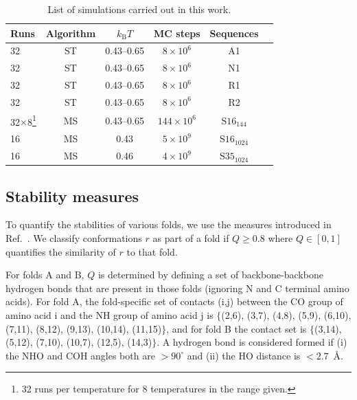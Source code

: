 \documentclass[%
 aip,
rsi,%
 amsmath,amssymb,
 reprint,%
]{revtex4-1}
\newcommand	 {\kb}		{{k_\mathrm{B}}}
\begin{document}
\begin{table}
\caption{\label{tab2} List of simulations carried out in this work. }
\begin{ruledtabular}
\begin{tabular}{lccccr}
Runs & Algorithm & $\kb T$  & MC steps &  Sequences\\
\hline
32 & ST & 0.43--0.65 & $8\times 10^6$ &A1\\ 
32 & ST & 0.43--0.65 & $8\times 10^6$ &N1\\ 
32 & ST & 0.43--0.65 & $8\times 10^6$ &R1\\ 
32 & ST & 0.43--0.65 & $8\times 10^6$ &R2\\ 
32$\times$8\footnote{32  runs per temperature for 8 temperatures in the range given.} & MS &0.43--0.65& $144\times 10^6$ & $\mathrm{S16}_{144}$\\
16 & MS & 0.43  & $5\times 10^9$ &  $\mathrm{S16}_{1024}$ \\
16 & MS & 0.46 & $4\times 10^9$ &  $\mathrm{S35}_{1024}$ \\
\end{tabular}
\end{ruledtabular}
\end{table}

\subsection{Stability measures}
\noindent
To quantify the stabilities of various folds, we use the measures introduced in Ref.~\cite{Holzgrafe2015}. We classify conformations $r$ as part of a fold if $Q\ge0.8$ where $Q\in [0,1]$ quantifies the similarity of $r$ to that fold. 

For folds A and B, $Q$ is determined by defining a set of backbone-backbone hydrogen bonds that are present in those folds (ignoring N and C terminal amino acids). For fold A, the fold-specific set of contacts (i,j) between the CO group of amino acid i and the NH group of amino acid j is $\{$(2,6), (3,7), (4,8), (5,9), (6,10), (7,11), (8,12), (9,13), (10,14), (11,15)$\}$, and for fold B the contact set is $\{$(3,14), (5,12), (7,10), (10,7), (12,5), (14,3)$\}$. A hydrogen bond is considered formed if (i) the NHO and COH angles both are $>90^\circ$ and (ii) the HO distance is $<2.7$~{\AA}. 

%
\end{document}
